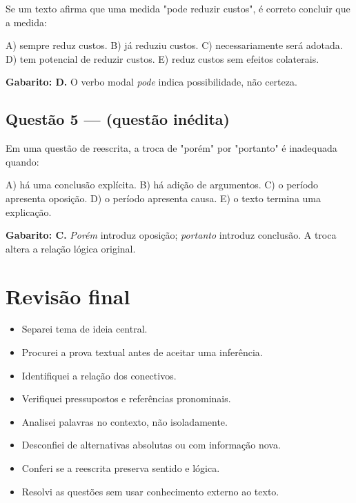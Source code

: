 \documentclass[11pt,a4paper]{article}
\begin{document}
Se um texto afirma que uma medida "pode reduzir custos", é correto concluir que a medida:

A) sempre reduz custos. B) já reduziu custos. C) necessariamente será adotada. D) tem potencial de reduzir custos. E) reduz custos sem efeitos colaterais.

\begin{alerta}
\textbf{Gabarito: D.} O verbo modal \textit{pode} indica possibilidade, não certeza.
\end{alerta}

\subsection*{Questão 5 — (questão inédita)}

Em uma questão de reescrita, a troca de "porém" por "portanto" é inadequada quando:

A) há uma conclusão explícita. B) há adição de argumentos. C) o período apresenta oposição. D) o período apresenta causa. E) o texto termina uma explicação.

\begin{alerta}
\textbf{Gabarito: C.} \textit{Porém} introduz oposição; \textit{portanto} introduz conclusão. A troca altera a relação lógica original.
\end{alerta}

\section*{Revisão final}

\begin{itemize}
  \item[$\square$] Separei tema de ideia central.
  \item[$\square$] Procurei a prova textual antes de aceitar uma inferência.
  \item[$\square$] Identifiquei a relação dos conectivos.
  \item[$\square$] Verifiquei pressupostos e referências pronominais.
  \item[$\square$] Analisei palavras no contexto, não isoladamente.
  \item[$\square$] Desconfiei de alternativas absolutas ou com informação nova.
  \item[$\square$] Conferi se a reescrita preserva sentido e lógica.
  \item[$\square$] Resolvi as questões sem usar conhecimento externo ao texto.
\end{itemize}
\end{document}
